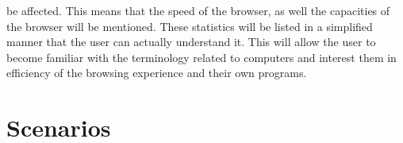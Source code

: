 \documentclass[11pt]{article}
\begin{document}
be affected. This means that the speed of the browser, as well the capacities of the browser will be mentioned. These statistics will be listed in a simplified manner that the user can actually understand it. This will allow the user to become familiar with the terminology related to computers and interest them in efficiency of the browsing experience and their own programs. 

\section{Scenarios}
\end{document}
